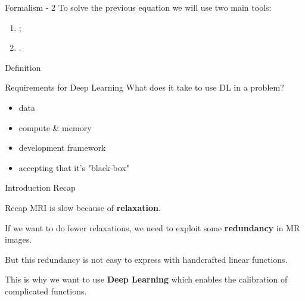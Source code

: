 \begin{frame}{Formalism - 2}
    To solve the previous equation we will use two main tools:
    
    \begin{enumerate}
        \item {};
        \item<2> .
    \end{enumerate}

    
        \begin{block}{Definition}
        \end{block}   
    
\end{frame}

\begin{frame}{Requirements for Deep Learning}
    What does it take to use DL in a problem?
    \begin{itemize}[<+->]
        \item data
        \item compute \& memory
        \item development framework
        \item accepting that it's "black-box"
    \end{itemize}
\end{frame}


\begin{frame}{Introduction Recap}
    \begin{block}{Recap}
        MRI is slow because of \textbf{relaxation}.
        
        \pause
        If we want to do fewer relaxations, we need to exploit some \textbf{redundancy} in MR images.
        
        \pause
        But this redundancy is not easy to express with handcrafted linear functions.
        
        \pause
        This is why we want to use \textbf{Deep Learning} which enables the calibration of complicated functions.
    \end{block}
\end{frame}
